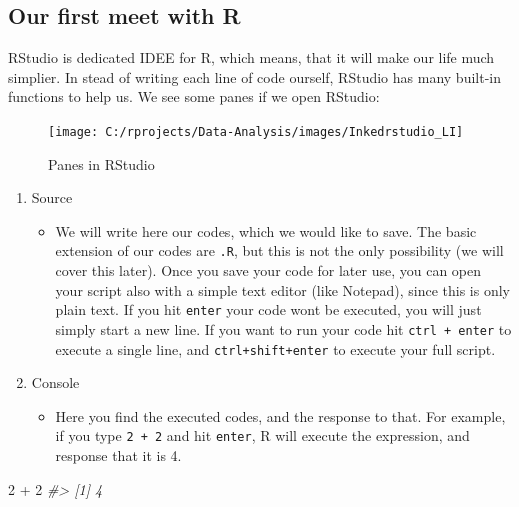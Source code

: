 \documentclass[
]{article}
\newenvironment{Shaded}{\begin{snugshade}}{\end{snugshade}}
\newcommand{\CommentTok}[1]{\textcolor[rgb]{0.56,0.35,0.01}{\textit{#1}}}
\newcommand{\DecValTok}[1]{\textcolor[rgb]{0.00,0.00,0.81}{#1}}
\newcommand{\SpecialCharTok}[1]{\textcolor[rgb]{0.00,0.00,0.00}{#1}}
\providecommand{\tightlist}{%
  \setlength{\itemsep}{0pt}\setlength{\parskip}{0pt}}
\begin{document}
\hypertarget{our-first-meet-with-r}{%
\subsection{Our first meet with R}\label{our-first-meet-with-r}}

RStudio is dedicated IDEE for R, which means, that it will make our life much simplier.
In stead of writing each line of code ourself, RStudio has many built-in functions to help us.
We see some panes if we open RStudio:

\begin{figure}

{\centering \texttt{[image: C:/rprojects/Data-Analysis/images/Inkedrstudio\_LI]} 

}

\caption{Panes in RStudio}\label{fig:unnamed-chunk-3}
\end{figure}

\begin{enumerate}
\def\labelenumi{\arabic{enumi}.}
\item
  Source

  \begin{itemize}
  \tightlist
  \item
    We will write here our codes, which we would like to save.
    The basic extension of our codes are \texttt{.R}, but this is not the only possibility (we will cover this later). Once you save your code for later use, you can open your script also with a simple text editor (like Notepad), since this is only plain text. If you hit \texttt{enter} your code wont be executed, you will just simply start a new line. If you want to run your code hit \texttt{ctrl\ +\ enter} to execute a single line, and \texttt{ctrl+shift+enter} to execute your full script.
  \end{itemize}
\item
  Console

  \begin{itemize}
  \tightlist
  \item
    Here you find the executed codes, and the response to that. For example, if you type \texttt{2\ +\ 2} and hit \texttt{enter}, R will execute the expression, and response that it is 4.
  \end{itemize}
\end{enumerate}

\begin{Shaded}
\begin{Highlighting}[]
\DecValTok{2} \SpecialCharTok{+} \DecValTok{2}
\CommentTok{\#\textgreater{} [1] 4}
\end{Highlighting}
\end{Shaded}
\end{document}
